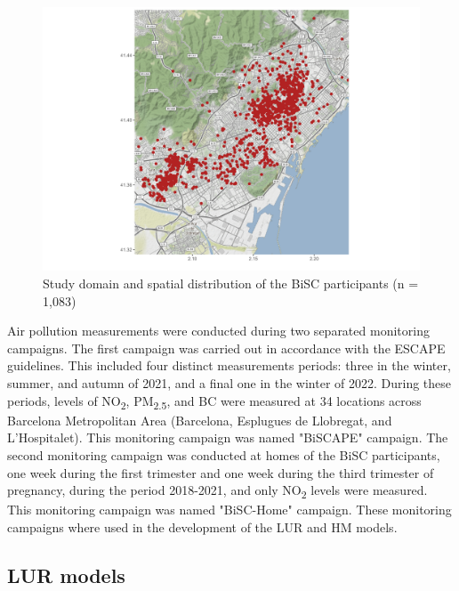 \documentclass{article}
\begin{document}
\captionsetup[figure]{skip=-4pt}
\begin{figure}[!htb]
\includegraphics[width=1\textwidth]{figures/bcn_map.png}
\caption{ Study domain and spatial distribution of the BiSC participants (n = 1,083)}
\label{fig1}
\end{figure}

Air pollution measurements were conducted during two separated monitoring campaigns. The first campaign was carried out in accordance with the ESCAPE guidelines. This included four distinct measurements periods: three in the winter, summer, and autumn of 2021, and a final one in the winter of 2022. During these periods, levels of NO\textsubscript{2}, PM\textsubscript{2.5}, and BC were measured at 34 locations across Barcelona Metropolitan Area (Barcelona, Esplugues de Llobregat, and L'Hospitalet). This monitoring campaign was named "BiSCAPE" campaign. The second monitoring campaign was conducted at homes of the BiSC participants, one week during the first trimester and one week during the third trimester of pregnancy, during the period 2018-2021, and only NO\textsubscript{2} levels were measured. This monitoring campaign was named "BiSC-Home" campaign. These monitoring campaigns where used in the development of the LUR and HM models. 

\newpage
\subsection{LUR models}
\end{document}
